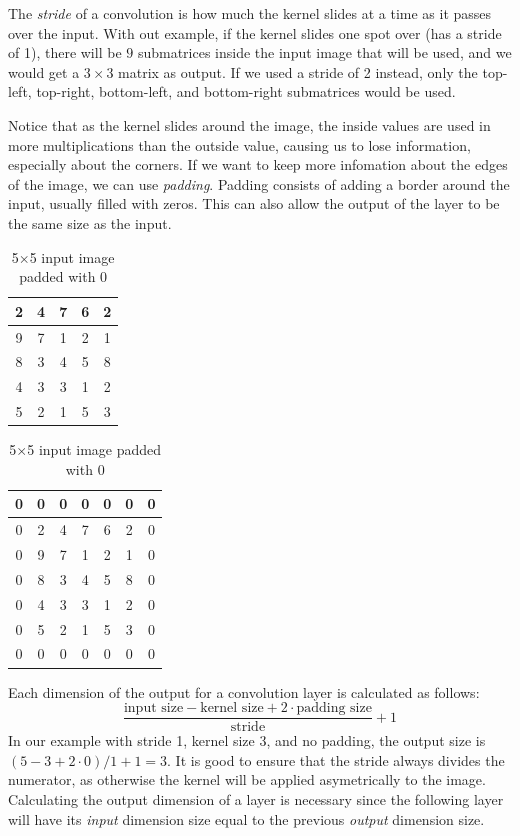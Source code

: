The \emph{stride} of a convolution is how much the kernel slides at a time as it passes over the input.
With out example, if the kernel slides one spot over (has a stride of 1), there will be $9$ submatrices inside the input image that will be used, and we would get a \(3\times 3\) matrix as output.
If we used a stride of 2 instead, only the top-left, top-right, bottom-left, and bottom-right submatrices would be used.

Notice that as the kernel slides around the image, the inside values are used in more multiplications than the outside value, causing us to lose information, especially about the corners.
If we want to keep more infomation about the edges of the image, we can use \emph{padding}.
Padding consists of adding a border around the input, usually filled with zeros.
This can also allow the output of the layer to be the same size as the input.
\begin{table}[H]
\parbox{.45\linewidth}{
\centering
\begin{tabular}{|c|c|c|c|c|}
\hline
2 & 4 & 7 & 6 & 2\\
\hline
9 & 7 & 1 & 2 & 1\\
\hline
8 & 3 & 4 & 5 & 8\\
\hline
4 & 3 & 3 & 1 & 2\\
\hline
5 & 2 & 1 & 5 & 3\\
\hline
\end{tabular}
\caption*{5$\times$5 input image}
}
\hfill
\parbox{.45\linewidth}{
\centering
\begin{tabular}{|c|c|c|c|c|c|c|}
\hline
0 & 0 & 0 & 0 & 0 & 0 & 0\\
\hline
0 & 2 & 4 & 7 & 6 & 2 & 0\\
\hline
0 & 9 & 7 & 1 & 2 & 1 & 0\\
\hline
0 & 8 & 3 & 4 & 5 & 8 & 0\\
\hline
0 & 4 & 3 & 3 & 1 & 2 & 0\\
\hline
0 & 5 & 2 & 1 & 5 & 3 & 0\\
\hline
0 & 0 & 0 & 0 & 0 & 0 & 0\\
\hline
\end{tabular}
\caption*{5$\times$5 input image padded with 0}
}
\end{table}


Each dimension of the output for a convolution layer is calculated as follows:
\[
\frac{\text{input size} - \text{kernel size} + 2\cdot \text{padding size}}{\text{stride}} + 1
\]
In our example with stride 1, kernel size 3, and no padding, the output size is $(5-3+2\cdot0)/1+1 = 3$.
It is good to ensure that the stride always divides the numerator, as otherwise the kernel will be applied asymetrically to the image.
Calculating the output dimension of a layer is necessary since the following layer will have its \emph{input} dimension size equal to the previous \emph{output} dimension size.

